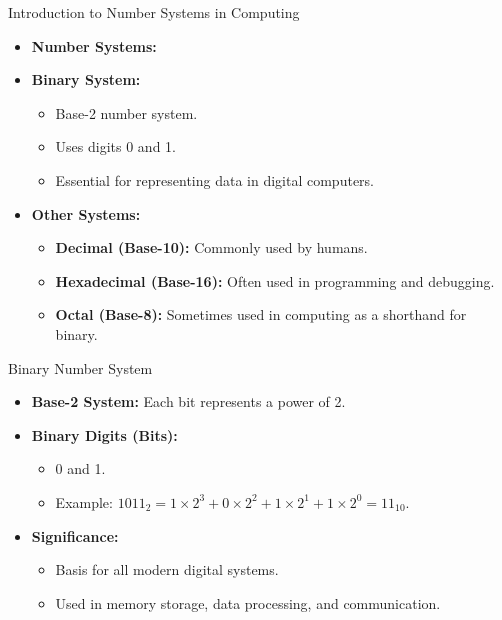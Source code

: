 \documentclass[aspectratio=169]{beamer}
\begin{document}
\begin{frame}{Introduction to Number Systems in Computing}
    \begin{itemize}
        \item \textbf{Number Systems:} 
        \item \textbf{Binary System:} 
        \begin{itemize}
            \item Base-2 number system.
            \item Uses digits 0 and 1.
            \item Essential for representing data in digital computers.
        \end{itemize}
        \item \textbf{Other Systems:}
        \begin{itemize}
            \item \textbf{Decimal (Base-10):} Commonly used by humans.
            \item \textbf{Hexadecimal (Base-16):} Often used in programming and debugging.
            \item \textbf{Octal (Base-8):} Sometimes used in computing as a shorthand for binary.
        \end{itemize}
    \end{itemize}
\end{frame}

\begin{frame}{Binary Number System}
    \begin{itemize}
        \item \textbf{Base-2 System:} Each bit represents a power of 2.
        \item \textbf{Binary Digits (Bits):} 
        \begin{itemize}
            \item 0 and 1.
            \item Example: \( 1011_2 = 1 \times 2^3 + 0 \times 2^2 + 1 \times 2^1 + 1 \times 2^0 = 11_{10} \).
        \end{itemize}
        \item \textbf{Significance:} 
        \begin{itemize}
            \item Basis for all modern digital systems.
            \item Used in memory storage, data processing, and communication.
        \end{itemize}
    \end{itemize}
\end{frame}
\end{document}
